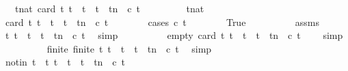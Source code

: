 \begin{isabellebody}
\ \ \ {\isacartoucheopen}{\isasymforall}t{\isacharcolon}{\isacharcolon}nat{\isachardot}\ card\ {\isacharbraceleft}t{\isacharprime}{\isachardot}\ t\ {\isasymle}\ t{\isacharprime}\ {\isasymand}\ t{\isacharprime}\ {\isasymle}\ t{\isacharplus}n\ {\isasymand}\ c\ t{\isacharprime}{\isacharbraceright}\ {\isasymle}\ {}{\isacartoucheclose}\isanewline
%
\isadelimproof
%
\endisadelimproof
%
\isatagproof
{}\isamarkupfalse%
\ {\isacharminus}\isanewline
\ \ \isacommand{{\isacharbraceleft}}\isamarkupfalse%
\ \isamarkupfalse%
\ t{\isacharcolon}{\isacharcolon}nat\isanewline
\ \ \ \ \isamarkupfalse%
\ {\isacartoucheopen}card\ {\isacharbraceleft}t{\isacharprime}{\isachardot}\ t\ {\isasymle}\ t{\isacharprime}\ {\isasymand}\ t{\isacharprime}\ {\isasymle}\ t{\isacharplus}n\ {\isasymand}\ c\ t{\isacharprime}{\isacharbraceright}\ {\isasymle}\ {}{\isacartoucheclose}\isanewline
\ \ \ \ \isamarkupfalse%
\ {\isacharparenleft}cases\ {\isacartoucheopen}c\ t{\isacartoucheclose}{\isacharparenright}\isanewline
\ \ \ \ \ \ \isamarkupfalse%
\ True\isanewline
\ \ \ \ \ \ \ \ \isamarkupfalse%
\ assms\ \isamarkupfalse%
\ {\isacartoucheopen}{\isasymforall}t{\isacharprime}{\isachardot}\ {\isacharparenleft}t\ {\isacharless}\ t{\isacharprime}\ {\isasymand}\ t{\isacharprime}\ {\isasymle}\ t{\isacharplus}n{\isacharparenright}\ {\isasymlongrightarrow}\ {\isasymnot}{\isacharparenleft}c\ t{\isacharprime}{\isacharparenright}{\isacartoucheclose}\ \isamarkupfalse%
\ simp\isanewline
\ \ \ \ \ \ \ \ \isamarkupfalse%
\ empty{\isacharcolon}\ {\isacartoucheopen}card\ {\isacharbraceleft}t{\isacharprime}{\isachardot}\ t\ {\isacharless}\ t{\isacharprime}\ {\isasymand}\ t{\isacharprime}\ {\isasymle}\ t{\isacharplus}n\ {\isasymand}\ c\ t{\isacharprime}{\isacharbraceright}\ {\isacharequal}\ {}{\isacartoucheclose}\ \isamarkupfalse%
\ simp\isanewline
\ \ \ \ \ \ \ \ \isamarkupfalse%
\ finite{\isacharcolon}\ {\isacartoucheopen}finite\ {\isacharbraceleft}t{\isacharprime}{\isachardot}\ t\ {\isacharless}\ t{\isacharprime}\ {\isasymand}\ t{\isacharprime}\ {\isasymle}\ t{\isacharplus}n\ {\isasymand}\ c\ t{\isacharprime}{\isacharbraceright}{\isacartoucheclose}\ \isamarkupfalse%
\ simp\isanewline
\ \ \ \ \ \ \ \ \isamarkupfalse%
\ notin{\isacharcolon}\ {\isacartoucheopen}t\ {\isasymnotin}\ {\isacharbraceleft}t{\isacharprime}{\isachardot}\ t\ {\isacharless}\ t{\isacharprime}\ {\isasymand}\ t{\isacharprime}\ {\isasymle}\ t{\isacharplus}n\ {\isasymand}\ c\ t{\isacharprime}{\isacharbraceright}{\isacartoucheclose}\ \isamarkupfalse%

\end{isabellebody}
